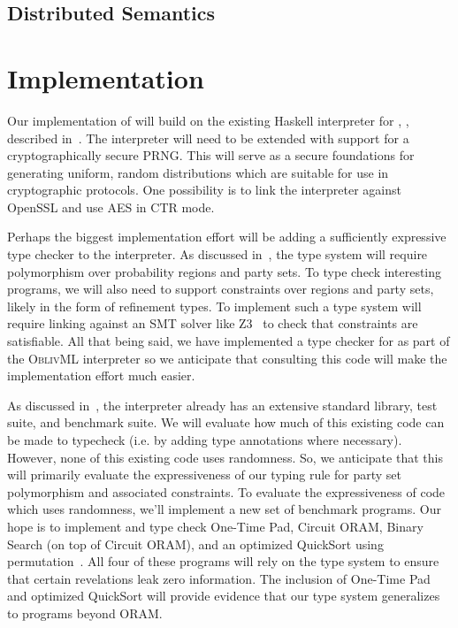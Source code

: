 
\subsection{Distributed Semantics}
\label{subsec:proposal-design-dist}



\section{Implementation}
\label{sec:proposal-impl}

Our implementation of \lang will build on the existing Haskell interpreter for \mpc, \system, described in~.
The interpreter will need to be extended with support for a cryptographically secure PRNG. This will serve as a secure foundations for
generating uniform, random distributions which are suitable for use in cryptographic protocols. One possibility is to link the interpreter
against OpenSSL and use AES in CTR mode.

Perhaps the biggest implementation effort will be adding a sufficiently expressive type checker to the interpreter. As discussed
in~, the type system will require polymorphism over probability regions and party sets. To
type check interesting programs, we will also need to support constraints over regions and party sets, likely in the form of
refinement types. To implement such a type system will require linking against an SMT solver like Z3~\cite{} to check that
constraints are satisfiable. All that being said, we have implemented a type checker for \obliv as part of the \textsc{OblivML}
interpreter so we anticipate that consulting this code will make the implementation effort much easier.

As discussed in~, the \system interpreter already has an extensive standard library, test suite, and benchmark
suite. We will evaluate how much of this existing \system code can be made to typecheck (i.e. by adding type annotations where necessary).
However, none of this existing code uses randomness. So, we anticipate that this will primarily evaluate the expressiveness of our
typing rule for party set polymorphism and associated constraints. To evaluate the expressiveness of code which uses randomness,
we'll implement a new set of benchmark programs. Our hope is to implement and type check One-Time Pad, Circuit ORAM,
Binary Search (on top of Circuit ORAM), and an optimized QuickSort using permutation~\cite{hamada}. All four of these programs
will rely on the type system to ensure that certain revelations leak zero information. The inclusion of One-Time
Pad and optimized QuickSort will provide evidence that our type system generalizes to programs beyond ORAM.

